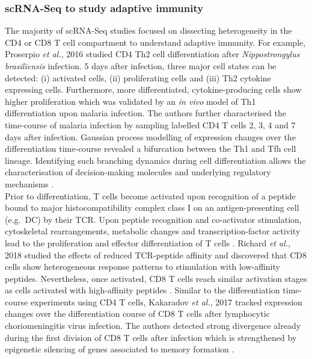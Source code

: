 \subsubsection{scRNA-Seq to study adaptive immunity}

The majority of scRNA-Seq studies focused on dissecting heterogeneity in the CD4\plus{} or CD8\plus{} T cell compartment to understand adaptive immunity. For example, Proserpio \emph{et al.}, 2016 studied CD4\plus{} Th2 cell differentiation after \textit{Nippostrongylus brasiliensis} infection. 5 days after infection, three major cell states can be detected: (i) activated cells, (ii) proliferating cells and (iii) Th2 cytokine expressing cells. Furthermore, more differentiated, cytokine-producing cells show higher proliferation which was validated by an \emph{in vivo} model of Th1 differentiation upon malaria infection\citep{Proserpio2016}. The authors further characterised the time-course of malaria infection by sampling labelled CD4\plus{} T cells 2, 3, 4 and 7 days after infection. Gaussian process modelling of expression changes over the differentiation time-course revealed a bifurcation between the Th1 and \gls{Tfh} cell lineage. Identifying such branching dynamics during cell differentiation allows the characterisation of decision-making molecules and underlying regulatory mechanisms \citep{Lonnberg2017}. \\

Prior to differentiation, T cells become activated upon recognition of a peptide bound to major histocompatibility complex class I on an antigen-presenting cell (e.g.~DC) by their \gls{TCR}. Upon peptide recognition and co-activator stimulation, cytoskeletal rearrangements, metabolic changes and transcription-factor activity lead to the proliferation and effector differentiation of T cells \citep{Richard2018}. Richard \emph{et al.}, 2018 studied the effects of reduced TCR-peptide affinity and discovered that CD8\plus{} cells show heterogeneous response patterns to stimulation with low-affinity peptides. Nevertheless, once activated, CD8\plus{} T cells reach similar activation stages as cells activated with high-affinity peptides \citep{Richard2018}. Similar to the differentiation time-course experiments using CD4\plus{} T cells, Kakaradov \emph{et al.}, 2017 tracked expression changes over the differentiation course of CD8\plus{} T cells after lymphocytic choriomeningitis virus infection. The authors detected strong divergence already during the first division of CD8\plus{} T cells after infection which is strengthened by epigenetic silencing of genes associated to memory formation \citep{Kakaradov2017}.\\

